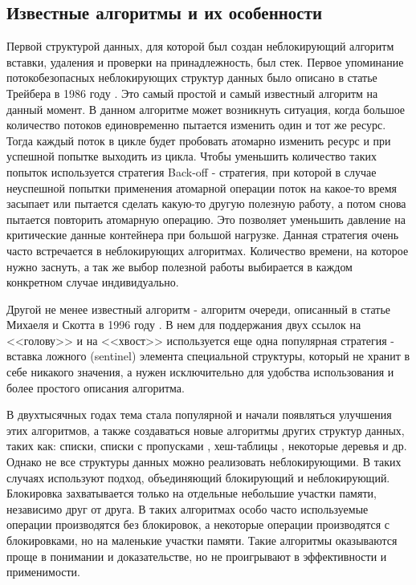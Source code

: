 \documentclass[12pt]{article}
\begin{document}
{			\subsection{Известные алгоритмы и их особенности}
				\par Первой структурой данных, для которой был создан неблокирующий алгоритм вставки, удаления и проверки на принадлежность, был стек. Первое упоминание потокобезопасных неблокирующих структур данных было описано в статье Трейбера в 1986 году \cite{Treiber}. Это самый простой и самый известный алгоритм на данный момент. В данном алгоритме может возникнуть ситуация, когда большое количество потоков единовременно пытается изменить один и тот же ресурс. Тогда каждый поток в цикле будет пробовать атомарно изменить ресурс и при успешной попытке выходить из цикла. Чтобы уменьшить количество таких попыток используется стратегия Back-off - стратегия, при которой в случае неуспешной попытки применения атомарной операции поток на какое-то время засыпает или пытается сделать какую-то другую полезную работу, а потом снова пытается повторить атомарную операцию. Это позволяет уменьшить давление на критические данные контейнера при большой нагрузке. Данная стратегия очень часто встречается в неблокирующих алгоритмах. Количество времени, на которое нужно заснуть, а так же выбор полезной работы выбирается в каждом конкретном случае индивидуально.
				\par Другой не менее известный алгоритм - алгоритм очереди, описанный в статье Михаеля и Скотта в 1996 году \cite{Queqe}. В нем для поддержания двух ссылок на <<голову>> и на <<хвост>> используется еще одна популярная стратегия - вставка ложного (sentinel) элемента специальной структуры, который не хранит в себе никакого значения, а нужен исключительно для удобства использования и более простого описания алгоритма.
				\par В двухтысячных годах тема стала популярной и начали появляться улучшения этих алгоритмов, а также создаваться новые алгоритмы других структур данных, таких как: списки\cite{LinkedList}, списки с пропусками \cite{ListSkipList},  хеш-таблицы \cite{HashTable}, некоторые деревья и др. Однако не все структуры данных можно реализовать неблокирующими. В таких случаях используют подход, объединяющий блокирующий и неблокирующий. Блокировка захватывается только на отдельные небольшие участки памяти, независимо друг от друга. В таких алгоритмах особо часто используемые операции производятся без блокировок, а некоторые операции производятся с блокировками, но на маленькие участки памяти. Такие алгоритмы оказываются проще в понимании и доказательстве, но не проигрывают в эффективности и применимости.  
}
\end{document}
